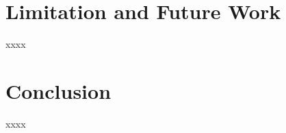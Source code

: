 \documentclass[conference]{IEEEtran}
\begin{document}
\section{Limitation and Future Work} 
xxxx

\section{Conclusion} 
xxxx

  

\end{document}
